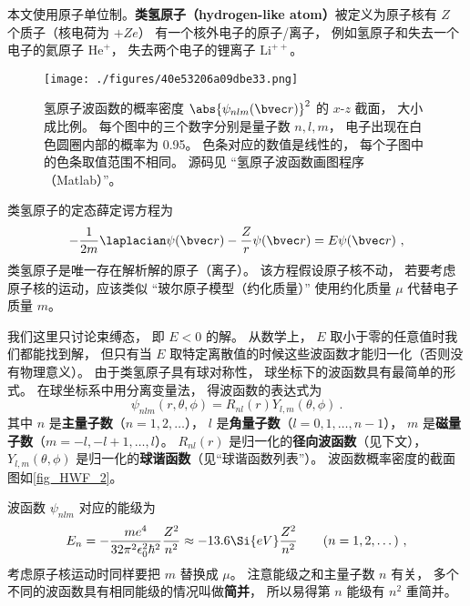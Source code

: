 

本文使用原子单位制。\textbf{类氢原子（hydrogen-like atom）}被定义为原子核有 $Z$ 个质子（核电荷为 $+Ze$） 有一个核外电子的原子/离子， 例如氢原子和失去一个电子的氦原子 $\mathrm{He}^+$， 失去两个电子的锂离子 $\mathrm{Li}^{++}$。 %

\begin{figure}[ht]
\centering
\texttt{[image: ./figures/40e53206a09dbe33.png]}
\caption{氢原子波函数的概率密度 $\abs{\psi_{nlm}(\bvec r)}^2$ 的 $x$-$z$ 截面， 大小成比例。 每个图中的三个数字分别是量子数 $n, l, m$， 电子出现在白色圆圈内部的概率为 0.95。 色条对应的数值是线性的， 每个子图中的色条取值范围不相同。 源码见 “氢原子波函数画图程序（Matlab）”。} \label{fig_HWF_2}
\end{figure}

类氢原子的定态薛定谔方程为
\begin{equation}\label{eq_HWF_1}
-\frac{1}{2m} \laplacian \psi(\bvec r) - \frac{Z}{r} \psi(\bvec r) = E \psi(\bvec r)~,
\end{equation}
类氢原子是唯一存在解析解的原子（离子）。 该方程假设原子核不动， 若要考虑原子核的运动，应该类似 “玻尔原子模型（约化质量）” 使用约化质量 $\mu$ 代替电子质量 $m$。

我们这里只讨论束缚态， 即 $E < 0$ 的解。  从数学上， $E$ 取小于零的任意值时我们都能找到解， 但只有当 $E$ 取特定离散值的时候这些波函数才能归一化（否则没有物理意义）。 由于类氢原子具有球对称性， 球坐标下的波函数具有最简单的形式。 在球坐标系中用分离变量法， 得波函数的表达式为
\begin{equation}\label{eq_HWF_3}
\psi_{nlm} (r,\theta ,\phi) = R_{nl}(r) Y_{l,m}(\theta, \phi)~.
\end{equation}
其中 $n$ 是\textbf{主量子数}（$n = 1, 2, \dots$）， $l$ 是\textbf{角量子数}（$l = 0, 1, \dots, n - 1$）， $m$ 是\textbf{磁量子数}（$m = -l, -l+1, \dots, l$）。 $R_{nl}(r)$ 是归一化的\textbf{径向波函数}（见下文）， $Y_{l,m}(\theta, \phi)$ 是归一化的\textbf{球谐函数}（见“球谐函数列表”）。 波函数概率密度的截面图如\autoref{fig_HWF_2}。

波函数 $\psi_{nlm}$ 对应的能级为
\begin{equation}\label{eq_HWF_5}
E_n =  - \frac{m e^4}{32 \pi^2 \epsilon_0^2 \hbar ^2} \frac{Z^2}{n^2} \approx - 13.6\Si{eV} \frac{Z^2}{n^2}
\qquad (n = 1, 2, \dots)~,
\end{equation}
考虑原子核运动时同样要把 $m$ 替换成 $\mu$。 注意能级之和主量子数 $n$ 有关， 多个不同的波函数具有相同能级的情况叫做\textbf{简并}， 所以易得第 $n$ 能级有 $n^2$ 重简并。

